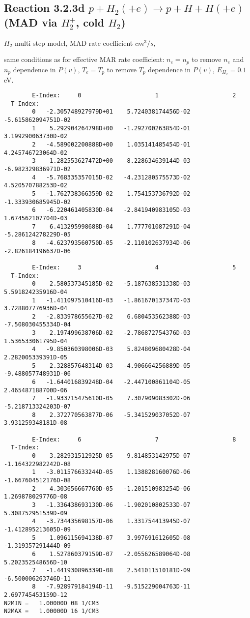 \documentclass[12pt,dvipdfmx]{article}
\begin{document}
\subsection{
Reaction 3.2.3d   $p + H_2 (+e)   \rightarrow p + H + H (+e) $ (MAD via $H_2^+$, cold $H_2$)
}

$H_2$ multi-step model, MAD rate coefficient $cm^3/s$,

same conditions as for effective MAR rate coefficient: $n_e=n_p$ to remove $n_e$ and $n_p$ dependence in $P(v)$,
$T_e=T_p$ to remove $T_p$ dependence in $P(v)$,  $E_{H_2}=0.1$ eV.

\begin{small}\begin{verbatim}
        E-Index:     0                     1                     2
  T-Index:
        0   -2.305748927979D+01    5.724038174456D-02   -5.615862094751D-02
        1    5.292904264798D+00   -1.292700263854D-01    3.199290063730D-02
        2   -4.589002200888D+00    1.035141485454D-01    4.245746723064D-02
        3    1.282553627472D+00    8.228634639144D-03   -6.982329836971D-02
        4   -5.768335357015D-02   -4.231280575573D-02    4.520570788253D-02
        5   -1.762738366359D-02    1.754153736792D-02   -1.333930685945D-02
        6   -6.220461405830D-04   -2.841940983105D-03    1.674562107704D-03
        7    6.413295998688D-04    1.777701087291D-04   -5.286124278229D-05
        8   -4.623793560750D-05   -2.110102637934D-06   -2.826184196637D-06

        E-Index:     3                     4                     5
  T-Index:
        0    2.580537345185D-02   -5.187638531338D-03    5.591824235916D-04
        1   -1.411097510416D-03   -1.861670137347D-03    3.728807776936D-04
        2   -2.833978655627D-02    6.680453562388D-03   -7.508030455334D-04
        3    2.197499638706D-02   -2.786872754376D-03    1.536533061795D-04
        4   -9.850360398006D-03    5.824809680428D-04    2.282005339391D-05
        5    2.328857648314D-03   -4.906664256889D-05   -9.488057748931D-06
        6   -1.644016839248D-04   -2.447100861104D-05    2.465487188700D-06
        7   -1.933715475610D-05    7.307909083302D-06   -5.218713324203D-07
        8    2.372770563877D-06   -5.341529037052D-07    3.931259348181D-08

        E-Index:     6                     7                     8
  T-Index:
        0   -3.282931512925D-05    9.814853142975D-07   -1.164322982242D-08
        1   -3.011576633244D-05    1.138828160076D-06   -1.667604512176D-08
        2    4.303656667760D-05   -1.201510983254D-06    1.269878029776D-08
        3   -1.336438693130D-06   -1.902010802533D-07    5.308752951539D-09
        4   -3.734435698157D-06    1.331754413945D-07   -1.412895213605D-09
        5    1.096115694138D-07    3.997691612605D-08   -1.319357291444D-09
        6    1.527860379159D-07   -2.055626589064D-08    5.202352548656D-10
        7   -1.441930896339D-08    2.541011510181D-09   -6.500006263746D-11
        8   -7.928979184194D-11   -9.515229004763D-11    2.697745453159D-12
N2MIN =   1.00000D 08 1/CM3
N2MAX =   1.00000D 16 1/CM3


\end{verbatim}
\end{small}
\end{document}
